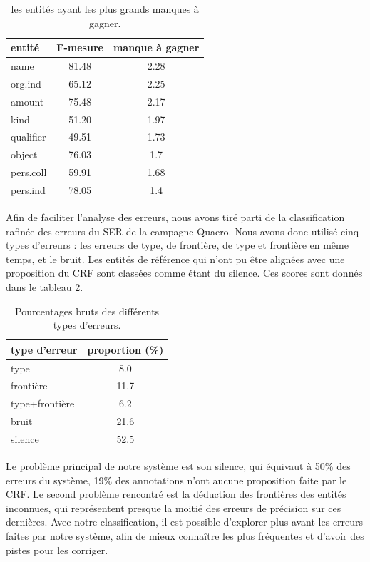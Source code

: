 \documentclass[PhD-Yoann-Dupont.tex]{subfiles}
\begin{document}
\begin{table}[ht!]
    \centering
    \begin{tabular}{|l|c|c|}
    \hline
    entité    & F-mesure & manque à gagner \\
    \hline
    name      & 81.48 & 2.28 \\
    org.ind   & 65.12 & 2.25 \\
    amount    & 75.48 & 2.17 \\
    kind      & 51.20 & 1.97 \\
    qualifier & 49.51 & 1.73 \\
    object    & 76.03 & 1.7  \\
    pers.coll & 59.91 & 1.68 \\
    pers.ind  & 78.05 & 1.4  \\
    \hline
    \end{tabular}
\caption{les entités ayant les plus grands manques à gagner.}
\label{tab:fscore-shortfalls}
\end{table}

Afin de faciliter l'analyse des erreurs, nous avons tiré parti de la classification rafinée des erreurs du SER de la campagne Quaero. Nous avons donc utilisé cinq types d'erreurs : les erreurs de type, de frontière, de type et frontière en même temps, et le bruit. Les entités de référence qui n'ont pu être alignées avec une proposition du CRF sont classées comme étant du silence. Ces scores sont donnés dans le tableau \ref{tab:error-types}. %

\begin{table}[ht!]
\centering
\begin{tabular}{|l|c|}
\hline
type d'erreur      & proportion (\%) \\
\hline
type & 8.0 \\
frontière & 11.7 \\
type+frontière    & 6.2 \\
bruit & 21.6 \\
silence & 52.5 \\
\hline
\end{tabular}
\caption{Pourcentages bruts des différents types d'erreurs.}
\label{tab:error-types}
\end{table}

Le problème principal de notre système est son silence, qui équivaut à 50\% des erreurs du système, 19\% des annotations n'ont aucune proposition faite par le CRF. Le second problème rencontré est la déduction des frontières des entités inconnues, qui représentent presque la moitié des erreurs de précision sur ces dernières. Avec notre classification, il est possible d'explorer plus avant les erreurs faites par notre système, afin de mieux connaître les plus fréquentes et d'avoir des pistes pour les corriger.
\end{document}
